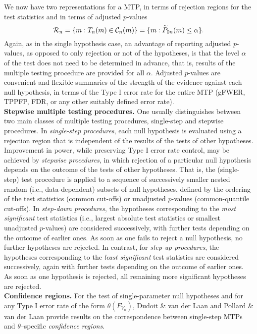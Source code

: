 \documentclass[11pt]{article}
\begin{document}
We now have two representations for a MTP, in terms of rejection regions for the test statistics  and in terms of adjusted $p$-values 
\begin{equation}
{\cal R}_n = \{m: T_n(m) \in {\cal C}_n(m) \} = \{m: \widetilde{P}_{0n}(m) \leq \alpha\}.
\end{equation}
Again, as in the single hypothesis case, an
advantage of reporting adjusted $p$-values, as opposed to only
rejection or not of the hypotheses, is that the level $\alpha$ of the test does
not need to be determined in advance, that is, results of the multiple
testing procedure are provided for all $\alpha$. 
 Adjusted $p$-values are convenient and flexible summaries of the strength of the evidence against each null hypothesis, in terms of the Type I error rate for the entire MTP (gFWER, TPPFP, FDR, or any other suitably defined error rate). \\

\noindent
{\bf Stepwise multiple testing procedures.} 
One usually distinguishes between two main classes of multiple testing
procedures, single-step and stepwise procedures.  
 In {\em single-step procedures}, each null hypothesis is
 evaluated using a rejection region that is  independent of the results of the tests of other hypotheses.
Improvement in power, while preserving Type I error rate
control, may be achieved by {\em stepwise procedures}, in which 
rejection of a particular null hypothesis depends on the outcome of
the tests of other hypotheses. 
That is, the (single-step) test procedure is applied to a sequence of successively smaller nested random (i.e., data-dependent) subsets of null hypotheses, defined by the ordering of the test statistics (common cut-offs) or unadjusted $p$-values (common-quantile cut-offs).
In {\em step-down procedures}, the hypotheses
corresponding to the {\em most significant} test statistics (i.e., largest absolute test
statistics or smallest unadjusted $p$-values) are considered successively, with further tests depending
on the outcome of earlier ones.
As soon as one fails to reject a null hypothesis, no further
hypotheses are rejected. 
In contrast, for {\em step-up procedures},
the hypotheses corresponding to the {\em least significant} test
statistics are considered successively, again with further tests
depending on the outcome of earlier ones. As soon as one hypothesis
is rejected, all remaining more significant hypotheses are rejected.\\



\noindent
{\bf Confidence regions.} 
For the test of single-parameter null hypotheses and for any Type I error rate of the form $\theta(F_{V_n})$, Dudoit \& van der Laan \cite{Dudoit&vdLaanMTBook} and Pollard \& van der Laan \cite{Pollard&vdLaanJSPI04} provide results on the correspondence between single-step MTPs and $\theta$--specific {\em confidence regions}.
\end{document}
